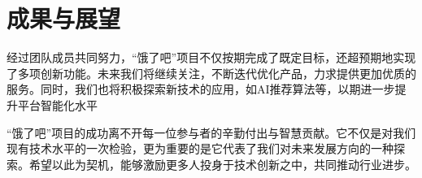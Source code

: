 \chapter{成果与展望}

经过团队成员共同努力，“饿了吧”项目不仅按期完成了既定目标，还超预期地实现了多项创新功能。未来我们将继续关注，不断迭代优化产品，力求提供更加优质的服务。同时，我们也将积极探索新技术的应用，如AI推荐算法等，以期进一步提升平台智能化水平

“饿了吧”项目的成功离不开每一位参与者的辛勤付出与智慧贡献。它不仅是对我们现有技术水平的一次检验，更为重要的是它代表了我们对未来发展方向的一种探索。希望以此为契机，能够激励更多人投身于技术创新之中，共同推动行业进步。